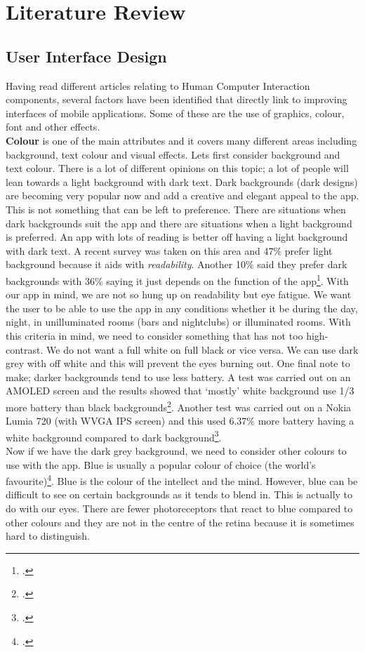 \section{Literature Review}

\subsection{User Interface Design}
Having read different articles relating to Human Computer Interaction components, several factors have been identified that directly link to improving interfaces of mobile applications.  Some of these are the use of graphics, colour, font and other effects.  \\
\textbf{Colour} is one of the main attributes and it covers many different areas including background, text colour and visual effects.  Lets first consider background and text colour.  There is a lot of different opinions on this topic; a lot of people will lean towards a light background with dark text.  Dark backgrounds (dark designs) are becoming very popular now and add a creative and elegant appeal to the app.  This is not something that can be left to preference.  There are situations when dark backgrounds suit the app and there are situations when a light background is preferred.  An app with lots of reading is better off having a light background with dark text.  A recent survey was taken on this area and 47\% prefer light background because it aids with \emph{readability}.   Another 10\% said they prefer dark backgrounds with 36\% saying it just depends on the function of the app\footcite{dark-web-design}.  With our app in mind, we are not so hung up on readability but eye fatigue.  We want the user to be able to use the app in any conditions whether it be during the day, night, in unilluminated rooms (bars and nightclubs) or illuminated rooms.  With this criteria in mind, we need to consider something that has not too high-contrast.  We do not want a full white on full black or vice versa.  We can use dark grey with off white and this will prevent the eyes burning out.  One final note to make; darker backgrounds tend to use less battery.  A test was carried out on an AMOLED screen and the results showed that `mostly' white background use 1/3 more battery than black backgrounds\footcite{dark-power}.  Another test was carried out on a Nokia Lumia 720 (with WVGA IPS screen) and this used 6.37\% more battery having a white background compared to dark background\footcite{battery}.  \\
Now if we have the dark grey background, we need to consider other colours to use with the app.  Blue is usually a popular colour of choice (the world's favourite)\footcite{blue}.  Blue is the colour of the intellect and the mind.  However, blue can be difficult to see on certain backgrounds as it tends to blend in.  This is actually to do with our eyes.  There are fewer photoreceptors that react to blue compared to other colours and they are not in the centre of the retina because it is sometimes hard to distinguish.  \\
